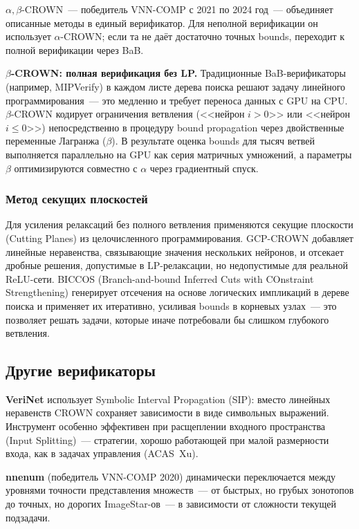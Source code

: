 $\alpha,\beta$-CROWN\cite{AlphaBetaCrownVNNCOMP23}~--- победитель
VNN-COMP с 2021 по 2024 год~--- объединяет описанные методы в единый
верификатор. Для неполной верификации он использует $\alpha$-CROWN;
если та не даёт достаточно точных bounds, переходит к полной верификации
через BaB.

\textbf{$\beta$-CROWN: полная верификация без LP.}
Традиционные BaB-верификаторы (например, MIPVerify) в каждом листе
дерева поиска решают задачу линейного программирования~--- это медленно
и требует переноса данных с GPU на CPU.
$\beta$-CROWN кодирует ограничения ветвления
(<<нейрон $i > 0$>> или <<нейрон $i \leq 0$>>)
непосредственно в процедуру bound propagation через двойственные
переменные Лагранжа ($\beta$).
В результате оценка bounds для тысяч ветвей выполняется параллельно
на GPU как серия матричных умножений, а параметры $\beta$ оптимизируются
совместно с $\alpha$ через градиентный спуск.

\subsubsection{Метод секущих плоскостей}

Для усиления релаксаций без полного ветвления применяются секущие
плоскости (Cutting Planes) из целочисленного программирования.
GCP-CROWN добавляет линейные неравенства, связывающие значения нескольких
нейронов, и отсекает дробные решения, допустимые в LP-релаксации, но
недопустимые для реальной ReLU-сети.
BICCOS (Branch-and-bound Inferred Cuts with COnstraint Strengthening)
генерирует отсечения на основе логических импликаций в дереве поиска
и применяет их итеративно, усиливая bounds в корневых узлах~--- это
позволяет решать задачи, которые иначе потребовали бы слишком глубокого
ветвления.\cite{AutoLiRPAPracticeSlides}

\subsection{Другие верификаторы}

\textbf{VeriNet} использует Symbolic Interval Propagation (SIP):
вместо линейных неравенств CROWN сохраняет зависимости в виде
символьных выражений.
Инструмент особенно эффективен при расщеплении входного пространства
(Input Splitting)~--- стратегии, хорошо работающей при малой размерности
входа, как в задачах управления (ACAS~Xu).\cite{IntervalReachabilityAnalysis}

\textbf{nnenum} (победитель VNN-COMP 2020) динамически переключается
между уровнями точности представления множеств~--- от быстрых, но грубых
зонотопов до точных, но дорогих ImageStar-ов~--- в зависимости от
сложности текущей подзадачи.\cite{NNEnumPaper}

